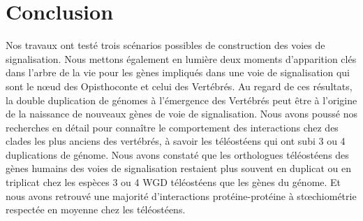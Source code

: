 \chapter{Conclusion}
\thispagestyle{firstpage}
\onehalfspacing

\par Nos travaux ont testé trois scénarios possibles de construction des voies de signalisation. Nous mettons également en lumière deux moments d’apparition clés dans l’arbre de la vie pour les gènes impliqués dans une voie de signalisation qui sont le nœud des Opisthoconte et celui des Vertébrés. Au regard de ces résultats, la double duplication de génomes à l’émergence des Vertébrés peut être à l’origine de la naissance de nouveaux gènes de voie de signalisation. Nous avons poussé nos recherches en détail pour connaître le comportement des interactions chez des clades les plus anciens des vertébrés, à savoir les téléostéens qui ont subi 3 ou 4 duplications de génome. Nous avons constaté que les orthologues téléostéens des gènes humains des voies de signalisation restaient plus souvent en duplicat ou en triplicat chez les espèces 3 ou 4 WGD téléostéens que les gènes du génome. Et nous avons retrouvé une majorité d’interactions protéine-protéine à stœchiométrie respectée en moyenne chez les téléostéens.